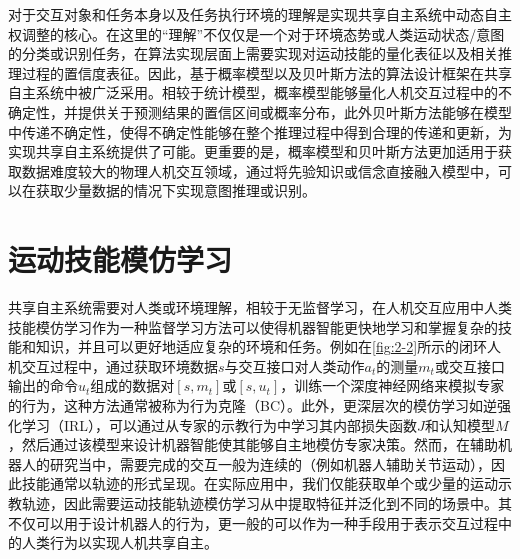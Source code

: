 对于交互对象和任务本身以及任务执行环境的理解是实现共享自主系统中动态自主权调整的核心。在这里的``理解''不仅仅是一个对于环境态势或人类运动状态/意图的分类或识别任务，在算法实现层面上需要实现对运动技能的量化表征以及相关推理过程的置信度表征。因此，基于概率模型以及贝叶斯方法的算法设计框架在共享自主系统中被广泛采用。相较于统计模型，概率模型能够量化人机交互过程中的不确定性，并提供关于预测结果的置信区间或概率分布，此外贝叶斯方法能够在模型中传递不确定性，使得不确定性能够在整个推理过程中得到合理的传递和更新，为实现共享自主系统提供了可能。更重要的是，概率模型和贝叶斯方法更加适用于获取数据难度较大的物理人机交互领域，通过将先验知识或信念直接融入模型中，可以在获取少量数据的情况下实现意图推理或识别。

\section{运动技能模仿学习}
共享自主系统需要对人类或环境理解，相较于无监督学习，在人机交互应用中人类技能模仿学习作为一种监督学习方法可以使得机器智能更快地学习和掌握复杂的技能和知识，并且可以更好地适应复杂的环境和任务。例如在\ref{fig:2-2}所示的闭环人机交互过程中，通过获取环境数据$s$与交互接口对人类动作$a_t$的测量$m_t$或交互接口输出的命令$u_t$组成的数据对$[s,m_t]$或$[s,u_t]$，训练一个深度神经网络来模拟专家的行为，这种方法通常被称为行为克隆（BC）。此外，更深层次的模仿学习如逆强化学习（IRL），可以通过从专家的示教行为中学习其内部损失函数$J$和认知模型$M$，然后通过该模型来设计机器智能使其能够自主地模仿专家决策。然而，在辅助机器人的研究当中，需要完成的交互一般为连续的（例如机器人辅助关节运动），因此技能通常以轨迹的形式呈现。在实际应用中，我们仅能获取单个或少量的运动示教轨迹，因此需要运动技能轨迹模仿学习从中提取特征并泛化到不同的场景中。其不仅可以用于设计机器人的行为，更一般的可以作为一种手段用于表示交互过程中的人类行为以实现人机共享自主。


